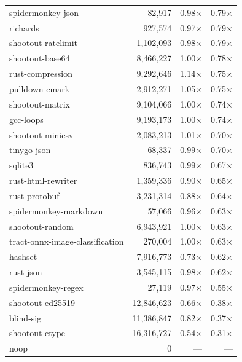 \begin{longtable}{l r r r}
spidermonkey-json & 82{,}917 & 0.98$\times$ & 0.79$\times$ \\
richards & 927{,}574 & 0.97$\times$ & 0.79$\times$ \\
shootout-ratelimit & 1{,}102{,}093 & 0.98$\times$ & 0.79$\times$ \\
shootout-base64 & 8{,}466{,}227 & 1.00$\times$ & 0.78$\times$ \\
rust-compression & 9{,}292{,}646 & 1.14$\times$ & 0.75$\times$ \\
pulldown-cmark & 2{,}912{,}271 & 1.05$\times$ & 0.75$\times$ \\
shootout-matrix & 9{,}104{,}066 & 1.00$\times$ & 0.74$\times$ \\
gcc-loops & 9{,}193{,}173 & 1.00$\times$ & 0.74$\times$ \\
shootout-minicsv & 2{,}083{,}213 & 1.01$\times$ & 0.70$\times$ \\
tinygo-json & 68{,}337 & 0.99$\times$ & 0.70$\times$ \\
sqlite3 & 836{,}743 & 0.99$\times$ & 0.67$\times$ \\
rust-html-rewriter & 1{,}359{,}336 & 0.90$\times$ & 0.65$\times$ \\
rust-protobuf & 3{,}231{,}314 & 0.88$\times$ & 0.64$\times$ \\
spidermonkey-markdown & 57{,}066 & 0.96$\times$ & 0.63$\times$ \\
shootout-random & 6{,}943{,}921 & 1.00$\times$ & 0.63$\times$ \\
tract-onnx-image-classification & 270{,}004 & 1.00$\times$ & 0.63$\times$ \\
hashset & 7{,}916{,}773 & 0.73$\times$ & 0.62$\times$ \\
rust-json & 3{,}545{,}115 & 0.98$\times$ & 0.62$\times$ \\
spidermonkey-regex & 27{,}119 & 0.97$\times$ & 0.55$\times$ \\
shootout-ed25519 & 12{,}846{,}623 & 0.66$\times$ & 0.38$\times$ \\
blind-sig & 11{,}386{,}847 & 0.82$\times$ & 0.37$\times$ \\
shootout-ctype & 16{,}316{,}727 & 0.54$\times$ & 0.31$\times$ \\
noop & 0 & --- & --- \\
\end{longtable}


